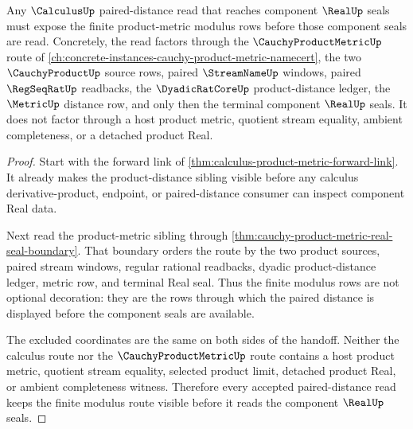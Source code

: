\begin{theorem}
\label{thm:calculus-product-metric-forward-modulus-route}
Any $\CalculusUp$ paired-distance read that reaches component $\RealUp$ seals must expose the finite product-metric modulus rows before those component seals are read. Concretely, the read factors through the $\CauchyProductMetricUp$ route of \autoref{ch:concrete-instances-cauchy-product-metric-namecert}, the two $\CauchyProductUp$ source rows, paired $\StreamNameUp$ windows, paired $\RegSeqRatUp$ readbacks, the $\DyadicRatCoreUp$ product-distance ledger, the $\MetricUp$ distance row, and only then the terminal component $\RealUp$ seals. It does not factor through a host product metric, quotient stream equality, ambient completeness, or a detached product Real.
\end{theorem}
\begin{proof}
Start with the forward link of \autoref{thm:calculus-product-metric-forward-link}. It already makes the product-distance sibling visible before any calculus derivative-product, endpoint, or paired-distance consumer can inspect component Real data.

Next read the product-metric sibling through \autoref{thm:cauchy-product-metric-real-seal-boundary}. That boundary orders the route by the two product sources, paired stream windows, regular rational readbacks, dyadic product-distance ledger, metric row, and terminal Real seal. Thus the finite modulus rows are not optional decoration: they are the rows through which the paired distance is displayed before the component seals are available.

The excluded coordinates are the same on both sides of the handoff. Neither the calculus route nor the $\CauchyProductMetricUp$ route contains a host product metric, quotient stream equality, selected product limit, detached product Real, or ambient completeness witness. Therefore every accepted paired-distance read keeps the finite modulus route visible before it reads the component $\RealUp$ seals.
\end{proof}

